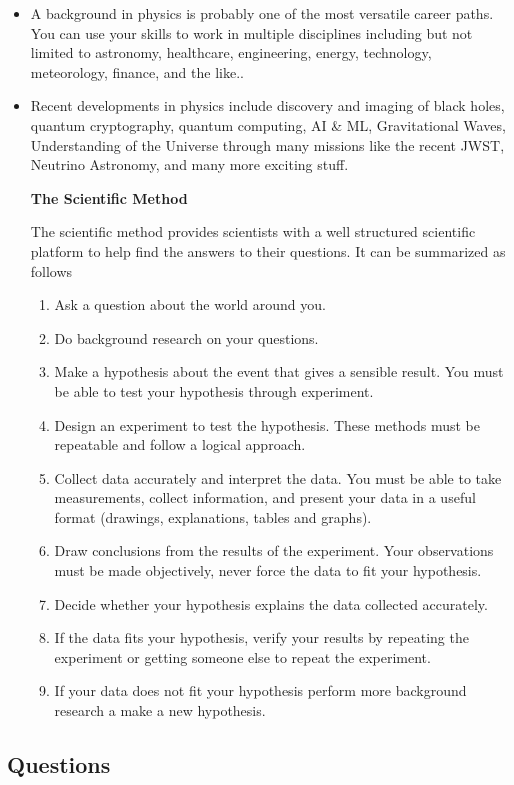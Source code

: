 \documentclass[12pt,addpoints]{exam}
\begin{document}
\begin{itemize}
		\item A background in physics is probably one of the most versatile career paths. You can use your skills to work in multiple disciplines including but not limited to  astronomy, healthcare, engineering, energy, technology, meteorology, finance, and the like..
		\item Recent developments in physics include discovery and imaging of black holes, quantum cryptography, quantum computing, AI \& ML, Gravitational Waves, Understanding of the Universe through many missions like the recent JWST, Neutrino Astronomy, and many more exciting stuff. 
		\begin{center}
		\textbf{The Scientific Method} 	
		\end{center}
		The scientific method provides scientists with a well structured
		scientific platform to help find the answers to their questions. It can be summarized as follows \begin{enumerate}
			\item Ask a question about the world around you.
			\item Do background research on your questions.
			\item Make a hypothesis about the event that gives a sensible result. You must be able to test your hypothesis through experiment.
			\item Design an experiment to test the hypothesis. These methods must be repeatable
			and follow a logical approach.
			\item Collect data accurately and interpret the data. You must be able to take measurements, collect information, and present your data in a useful format (drawings,
			explanations, tables and graphs).
			\item Draw conclusions from the results of the experiment. Your observations must be made objectively, never force the data to fit your hypothesis.
			\item Decide whether your hypothesis explains the data collected accurately.
			\item If the data fits your hypothesis, verify your results by repeating the experiment or getting someone else to repeat the experiment.
			\item If your data does not fit your hypothesis perform more background research a make a new hypothesis.
		\end{enumerate}
	\end{itemize}
	\begin{center}
	\subsection*{Questions}	
	\end{center}
\end{document}

